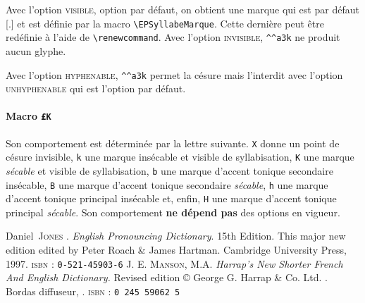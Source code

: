 \documentclass[a4paper]{article}
\newcommand\Option[1]{\textsc{#1}}
\begin{document}
Avec l'option \Option{visible}, option par d^^e9faut, on obtient une
marque qui est par d^^e9faut [.] et est d^^e9finie par la
macro \verb+\EPSyllabeMarque+. Cette derni^^e8re peut ^^eatre red^^e9finie ^^e0
l'aide de \verb+\renewcommand+.  Avec l'option \Option{invisible},
\verb+^^a3k+ ne produit aucun glyphe.

Avec l'option \Option{hyphenable}, \verb+^^a3k+ permet la c^^e9sure mais
l'interdit avec l'option \Option{unhyphenable} qui est l'option par
d^^e9faut.
\paragraph{Macro \texttt{^^a3K}} Son comportement est d^^e9termin^^e9e par la
lettre suivante. \texttt{X} donne un point de c^^e9sure invisible,
\texttt{k} une marque ins^^e9cable et visible de syllabisation,
\texttt{K} une marque \emph{s^^e9cable} et visible de syllabisation,
\texttt{b} une marque d'accent tonique secondaire ins^^e9cable,
\texttt{B} une marque d'accent tonique secondaire \emph{s^^e9cable},
\texttt{h} une marque d'accent tonique principal ins^^e9cable et, enfin,
\texttt{H} une marque d'accent tonique principal \emph{s^^e9cable}. Son
comportement \textbf{ne d^^e9pend pas} des options en vigueur.

\begin{thebibliography}{99}
 Daniel~\textsc{Jones} \dag.
\emph{English Pronouncing Dictionary}.
15th Edition. This major new edition edited by Peter Roach \& James
Hartman.
Cambridge University Press, 1997.
\textsc{isbn} : \texttt{0-521-45903-6}
 J. E. \textsc{Manson}, M.A.
\emph{Harrap's New Shorter French And English Dictionary.}
Revised edition \copyright{} George G. Harrap \&
Co. Ltd. .
Bordas diffuseur, .
\textsc{isbn} : \texttt{0 245 59062 5}
\end{thebibliography}
\newpage

\end{document}
